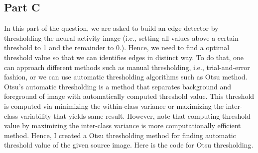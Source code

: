 \documentclass[12pt]{amsart}
\begin{document}
\subsection{Part C}

In this part of the question, we are asked to build an edge detector by thresholding the neural activity image (i.e., setting all values above a certain threshold to 1 and the remainder to 0.). Hence, we need to find a optimal threshold value so that we can identifies edges in distinct way. To do that, one can approach different methods such as manual thresholding, i.e., trial-and-error fashion, or we can use automatic thresholding algorithms such as Otsu method. Otsu's automatic thresholding is a method that separates background and foreground of image with automatically computed threshold value. This  threshold is computed via minimizing the within-class variance or  maximizing the inter-class variability that yields same result. However, note that computing threshold value by maximizing the inter-class variance is more computationally efficient method. Hence, I created a Otsu thresholding method for finding automatic threshold value of the given source image. Here is the code for Otsu thresholding.
\end{document}
